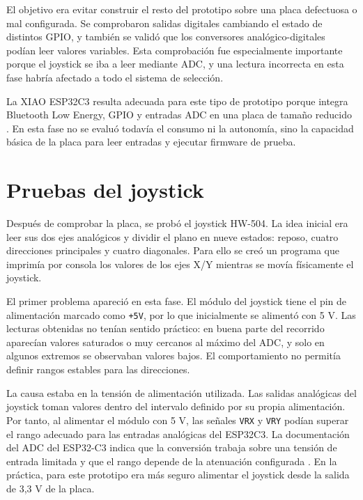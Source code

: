 El objetivo era evitar construir el resto del prototipo sobre una placa defectuosa o mal configurada. Se comprobaron salidas digitales cambiando el estado de distintos GPIO, y también se validó que los conversores analógico-digitales podían leer valores variables. Esta comprobación fue especialmente importante porque el joystick se iba a leer mediante ADC, y una lectura incorrecta en esta fase habría afectado a todo el sistema de selección.

La XIAO ESP32C3 resulta adecuada para este tipo de prototipo porque integra Bluetooth Low Energy, GPIO y entradas ADC en una placa de tamaño reducido \cite{xiaoESP32C3}. En esta fase no se evaluó todavía el consumo ni la autonomía, sino la capacidad básica de la placa para leer entradas y ejecutar firmware de prueba.

\section{Pruebas del joystick}
\label{sec:pruebas-joystick}

Después de comprobar la placa, se probó el joystick HW-504. La idea inicial era leer sus dos ejes analógicos y dividir el plano en nueve estados: reposo, cuatro direcciones principales y cuatro diagonales. Para ello se creó un programa que imprimía por consola los valores de los ejes X/Y mientras se movía físicamente el joystick.

El primer problema apareció en esta fase. El módulo del joystick tiene el pin de alimentación marcado como \texttt{+5V}, por lo que inicialmente se alimentó con 5 V. Las lecturas obtenidas no tenían sentido práctico: en buena parte del recorrido aparecían valores saturados o muy cercanos al máximo del ADC, y solo en algunos extremos se observaban valores bajos. El comportamiento no permitía definir rangos estables para las direcciones.

La causa estaba en la tensión de alimentación utilizada. Las salidas analógicas del joystick toman valores dentro del intervalo definido por su propia alimentación. Por tanto, al alimentar el módulo con 5 V, las señales \texttt{VRX} y \texttt{VRY} podían superar el rango adecuado para las entradas analógicas del ESP32C3. La documentación del ADC del ESP32-C3 indica que la conversión trabaja sobre una tensión de entrada limitada y que el rango depende de la atenuación configurada \cite{espressifADC}. En la práctica, para este prototipo era más seguro alimentar el joystick desde la salida de 3,3 V de la placa.

